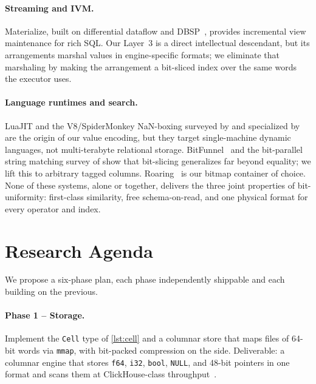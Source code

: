 \documentclass[10pt]{article}
\begin{document}
\paragraph{Streaming and IVM.}
Materialize, built on differential dataflow and
DBSP~\citep{mcsherry2013differential,budiu2023dbsp,murray2013naiad},
provides incremental view maintenance for rich SQL. Our Layer~3 is a
direct intellectual descendant, but its arrangements marshal values in
engine-specific formats; we eliminate that marshaling by making the
arrangement a bit-sliced index over the same words the executor uses.

\paragraph{Language runtimes and search.}
LuaJIT and the V8/SpiderMonkey NaN-boxing surveyed by
\citet{wingo2011value} and specialized by \citet{gal2009trace} are the
origin of our value encoding, but they target single-machine dynamic
languages, not multi-terabyte relational storage.
BitFunnel~\citep{goodwin2017bitfunnel} and the bit-parallel string
matching survey of \citet{cantone2014bitparallel} show that bit-slicing
generalizes far beyond equality; we lift this to arbitrary tagged
columns. Roaring~\citep{chambi2016roaring} is our bitmap container of
choice. None of these systems, alone or together, delivers the three
joint properties of bit-uniformity: first-class similarity, free
schema-on-read, and one physical format for every operator and index.

\section{Research Agenda}
\label{sec:agenda}

We propose a six-phase plan, each phase independently shippable and
each building on the previous.

\paragraph{Phase 1 -- Storage.}
Implement the \texttt{Cell} type of \cref{lst:cell} and a columnar
store that maps files of 64-bit words via \texttt{mmap}, with
bit-packed compression on the side. Deliverable: a columnar engine that
stores \texttt{f64}, \texttt{i32}, \texttt{bool}, \texttt{NULL}, and
48-bit pointers in one format and scans them at ClickHouse-class
throughput~\citep{schulze2024clickhouse,willhalm2009simd}.
\end{document}
